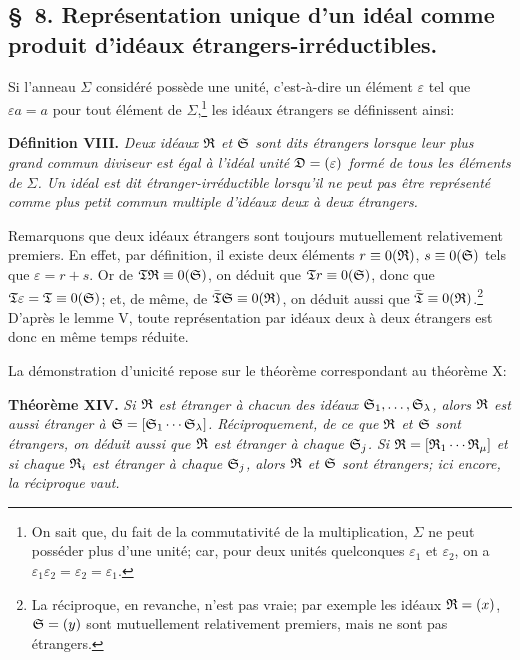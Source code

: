 
\setcounter{footnote}{31}
\subsection*{\S~8. Représentation unique d'un idéal comme produit d'idéaux étrangers-irréductibles.}

Si l'anneau $\Sigma$ considéré possède une unité, c'est-à-dire un élément $\varepsilon$ tel que $\varepsilon a=a$ pour tout élément de $\Sigma$,\footnote{On sait que, du fait de la commutativité de la multiplication, $\Sigma$ ne peut posséder plus d'une unité; car, pour deux unités quelconques $\varepsilon_1$ et $\varepsilon_2$, on a $\varepsilon_1\varepsilon_2=\varepsilon_2=\varepsilon_1$.} les idéaux étrangers se définissent ainsi:

\textbf{Définition VIII.} \emph{Deux idéaux $\mathfrak{R}$ et $\mathfrak{S}$ sont dits étrangers lorsque leur plus grand commun diviseur est égal à l'idéal unité $\mathfrak{D}=(\varepsilon)$ formé de tous les éléments de $\Sigma$. Un idéal est dit étranger-irréductible lorsqu'il ne peut pas être représenté comme plus petit commun multiple d'idéaux deux à deux étrangers.}

Remarquons que deux idéaux étrangers sont toujours mutuellement relativement premiers. En effet, par définition, il existe deux éléments $r\equiv0(\mathfrak{R})$, $s\equiv0(\mathfrak{S})$ tels que $\varepsilon=r+s$. Or de $\mathfrak{T}\mathfrak{R}\equiv0(\mathfrak{S})$, on déduit que $\mathfrak{T} r\equiv0(\mathfrak{S})$, donc que $\mathfrak{T}\varepsilon=\mathfrak{T}\equiv0(\mathfrak{S})$; et, de même, de $\bar{\mathfrak{T}}\mathfrak{S}\equiv0(\mathfrak{R})$, on déduit aussi que $\bar{\mathfrak{T}}\equiv0(\mathfrak{R})$.\footnote{La réciproque, en revanche, n'est pas vraie; par exemple les idéaux $\mathfrak{R}=(x)$, $\mathfrak{S}=(y)$ sont mutuellement relativement premiers, mais ne sont pas étrangers.} D'après le lemme V, toute représentation par idéaux deux à deux étrangers est donc en même temps réduite.

La démonstration d'unicité repose sur le théorème correspondant au théorème X:

\textbf{Théorème XIV.} \emph{Si $\mathfrak{R}$ est étranger à chacun des idéaux $\mathfrak{S}_1,\ldots,\mathfrak{S}_\lambda$, alors $\mathfrak{R}$ est aussi étranger à $\mathfrak{S}=[\mathfrak{S}_1\cdots\mathfrak{S}_\lambda]$. Réciproquement, de ce que $\mathfrak{R}$ et $\mathfrak{S}$ sont étrangers, on déduit aussi que $\mathfrak{R}$ est étranger à chaque $\mathfrak{S}_j$. Si $\mathfrak{R}=[\mathfrak{R}_1\cdots\mathfrak{R}_\mu]$ et si chaque $\mathfrak{R}_i$ est étranger à chaque $\mathfrak{S}_j$, alors $\mathfrak{R}$ et $\mathfrak{S}$ sont étrangers; ici encore, la réciproque vaut.}

